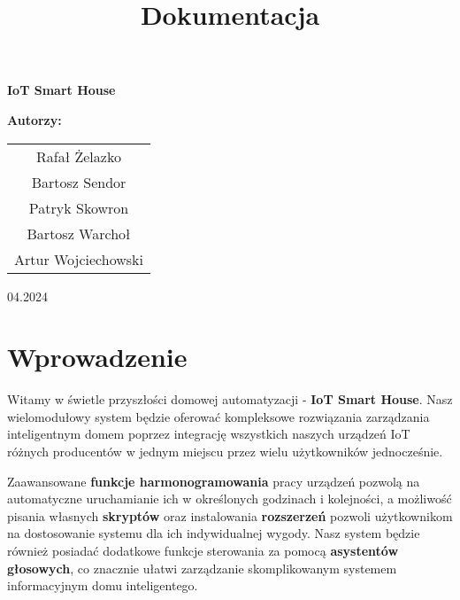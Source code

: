 \documentclass{article}
\begin{document}
	\title{\fontsize{40}{48}\selectfont \textbf{\textcolor{blue!80!black}{Dokumentacja}}}
	\author{}
	\date{}

	\maketitle

	\begin{center}
		\textbf{\LARGE \textcolor{blue!80!black}{IoT Smart House}}
	\end{center}

	\vspace{2cm}

	\begin{center}
		\large \textbf{Autorzy:}

		\vspace{0.3cm}

		\begin{tabular}{c}
			Rafał Żelazko       \\
			Bartosz Sendor      \\
			Patryk Skowron      \\
			Bartosz Warchoł     \\
			Artur Wojciechowski \\
		\end{tabular}
	\end{center}

	\vspace{7cm}

	\begin{flushright}
		\large 04.2024
	\end{flushright}
	\newpage

	\maketitle

	\clearpage
	\tableofcontents
	\clearpage

	\section{Wprowadzenie}

	Witamy w świetle przyszłości domowej automatyzacji - \textbf{IoT Smart House}.
	Nasz wielomodułowy system będzie oferować kompleksowe rozwiązania zarządzania
	inteligentnym domem poprzez integrację wszystkich naszych urządzeń IoT różnych
	producentów w jednym miejscu przez wielu użytkowników jednocześnie.

	Zaawansowane \textbf{funkcje harmonogramowania} pracy urządzeń pozwolą na automatyczne
	uruchamianie ich w określonych godzinach i kolejności, a możliwość pisania
	własnych \textbf{skryptów} oraz instalowania \textbf{rozszerzeń} pozwoli
	użytkownikom na dostosowanie systemu dla ich indywidualnej wygody. Nasz system
	będzie również posiadać dodatkowe funkcje sterowania za pomocą \textbf{asystentów
	głosowych}, co znacznie ułatwi zarządzanie skomplikowanym systemem informacyjnym
	domu inteligentego.
\end{document}
